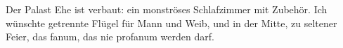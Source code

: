 Der Palast Ehe ist verbaut: ein monströses Schlafzimmer mit Zubehör. Ich wünschte getrennte Flügel für Mann und Weib, und in der Mitte, zu seltener Feier, das fanum, das nie profanum werden darf.
\par

